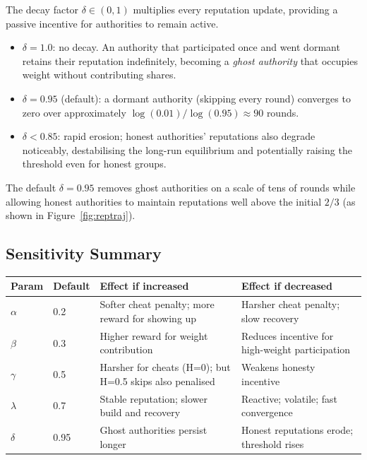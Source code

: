 \documentclass[12pt,a4paper]{article}
\theoremstyle{definition}
\theoremstyle{remark}
\begin{document}
The decay factor $\delta \in (0,1)$ multiplies every reputation update,
providing a passive incentive for authorities to remain active.

\begin{itemize}
  \item $\delta = 1.0$: no decay. An authority that participated once and
    went dormant retains their reputation indefinitely, becoming a
    \emph{ghost authority} that occupies weight without contributing shares.
  \item $\delta = 0.95$ (default): a dormant authority (skipping every round)
    converges to zero over approximately
    $\log(0.01)/\log(0.95) \approx 90$ rounds.
  \item $\delta < 0.85$: rapid erosion; honest authorities' reputations
    also degrade noticeably, destabilising the long-run equilibrium and
    potentially raising the threshold even for honest groups.
\end{itemize}

The default $\delta = 0.95$ removes ghost authorities on a scale of
tens of rounds while allowing honest authorities to maintain reputations
well above the initial $2/3$ (as shown in Figure~\ref{fig:reptraj}).

\subsection{Sensitivity Summary}

\begin{center}
\begin{tabular}{llp{4.8cm}p{4.8cm}}
\toprule
\textbf{Param} & \textbf{Default} & \textbf{Effect if increased}
               & \textbf{Effect if decreased} \\
\midrule
$\alpha$ & 0.2 & Softer cheat penalty; more reward for showing up
               & Harsher cheat penalty; slow recovery \\
$\beta$  & 0.3 & Higher reward for weight contribution
               & Reduces incentive for high-weight participation \\
$\gamma$ & 0.5 & Harsher for cheats (H=0); but H=0.5 skips also penalised
               & Weakens honesty incentive \\
$\lambda$ & 0.7 & Stable reputation; slower build and recovery
               & Reactive; volatile; fast convergence \\
$\delta$ & 0.95 & Ghost authorities persist longer
               & Honest reputations erode; threshold rises \\
\bottomrule
\end{tabular}
\end{center}
\end{document}
